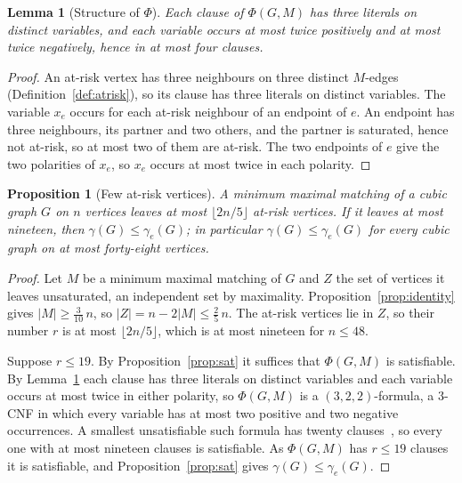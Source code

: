 \documentclass[11pt]{article}
\newtheorem{proposition}{Proposition}
\newtheorem{lemma}{Lemma}
\theoremstyle{definition}
\theoremstyle{remark}
\newcommand{\edom}{\gamma_{e}}
\begin{document}
\begin{lemma}[Structure of $\Phi$]\label{lem:sat}
Each clause of $\Phi(G,M)$ has three literals on distinct variables, and each
variable occurs at most twice positively and at most twice negatively, hence in
at most four clauses.
\end{lemma}

\begin{proof}
An at-risk vertex has three neighbours on three distinct $M$-edges
(Definition~\ref{def:atrisk}), so its clause has three literals on distinct
variables. The variable $x_e$ occurs for each at-risk neighbour of an endpoint of
$e$. An endpoint has three neighbours, its partner and two others, and the
partner is saturated, hence not at-risk, so at most two of them are at-risk. The
two endpoints of $e$ give the two polarities of $x_e$, so $x_e$ occurs at most
twice in each polarity.
\end{proof}

\begin{proposition}[Few at-risk vertices]\label{prop:fewatrisk}
A minimum maximal matching of a cubic graph $G$ on $n$ vertices leaves at most
$\lfloor 2n/5 \rfloor$ at-risk vertices. If it leaves at most nineteen, then
$\gamma(G) \le \edom(G)$; in particular $\gamma(G) \le \edom(G)$ for every cubic
graph on at most forty-eight vertices.
\end{proposition}

\begin{proof}
Let $M$ be a minimum maximal matching of $G$ and $Z$ the set of vertices it leaves
unsaturated, an independent set by maximality. Proposition~\ref{prop:identity}
gives $|M| \ge \tfrac{3}{10}\,n$, so $|Z| = n - 2|M| \le \tfrac{2}{5}\,n$.
The at-risk vertices lie in $Z$, so their number $r$ is at most
$\lfloor 2n/5 \rfloor$, which is at most nineteen for $n \le 48$.

Suppose $r \le 19$. By Proposition~\ref{prop:sat} it suffices that $\Phi(G,M)$ is
satisfiable. By Lemma~\ref{lem:sat} each clause has three literals on distinct
variables and each variable occurs at most twice in either polarity, so
$\Phi(G,M)$ is a $(3,2,2)$-formula, a $3$-CNF in which every variable has at
most two positive and two negative occurrences. A smallest unsatisfiable such
formula has twenty clauses~\cite{ZhangPeitlSzeider2024}, so every one with at
most nineteen clauses is satisfiable. As $\Phi(G,M)$ has $r \le 19$ clauses it is
satisfiable, and Proposition~\ref{prop:sat} gives $\gamma(G) \le \edom(G)$.
\end{proof}
\end{document}

